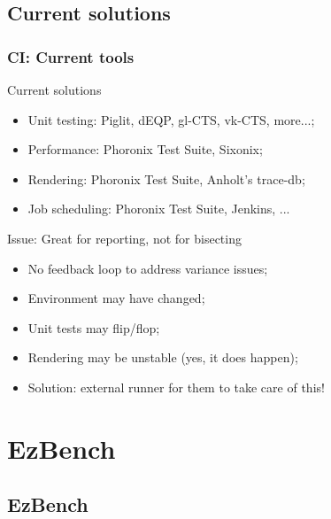 \documentclass[11pt,english,compress]{beamer}
\begin{document}
\subsection*{Current solutions}
\begin{frame}
	\frametitle{CI: Current tools}
	
	\begin{block}{Current solutions}
		\begin{itemize}
			\item Unit testing: Piglit, dEQP, gl-CTS, vk-CTS, more...;
			\item Performance: Phoronix Test Suite, Sixonix;
			\item Rendering: Phoronix Test Suite, Anholt's trace-db;
			\item Job scheduling: Phoronix Test Suite, Jenkins, ...
		\end{itemize}
	\end{block}
	
	\pause
	
	\begin{block}{Issue: Great for reporting, not for bisecting}
		\begin{itemize}
			\item No feedback loop to address variance issues;
			\item Environment may have changed;
			\item Unit tests may flip/flop;
			\item Rendering may be unstable (yes, it does happen);
			\item Solution: external runner for them to take care of this!
		\end{itemize}
	\end{block}
\end{frame}

\section{EzBench}
\subsection*{EzBench}
\end{document}
